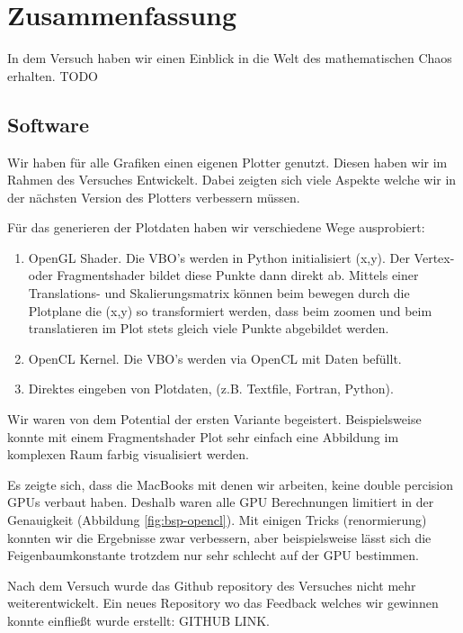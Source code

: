 \documentclass{scrartcl}
\begin{document}
\section { Zusammenfassung }
In dem Versuch haben wir einen Einblick in die Welt des mathematischen Chaos erhalten. TODO
\subsection{Software}
Wir haben für alle Grafiken einen eigenen Plotter genutzt. Diesen haben wir im Rahmen des Versuches Entwickelt. Dabei zeigten sich viele Aspekte welche wir in der nächsten Version des Plotters verbessern müssen.

Für das generieren der Plotdaten haben wir verschiedene Wege ausprobiert:
\begin{enumerate}
\item OpenGL Shader. Die VBO's werden in Python initialisiert (x,y). Der Vertex- oder Fragmentshader bildet diese Punkte dann direkt ab. Mittels einer Translations- und Skalierungsmatrix können beim bewegen durch die Plotplane die (x,y) so transformiert werden, dass beim zoomen und beim translatieren im Plot stets gleich viele Punkte abgebildet werden. 
\item OpenCL Kernel. Die VBO's werden via OpenCL mit Daten befüllt. 
\item Direktes eingeben von Plotdaten, (z.B. Textfile, Fortran, Python).
\end{enumerate}
Wir waren von dem Potential der ersten Variante begeistert. Beispielsweise konnte mit einem Fragmentshader Plot sehr einfach eine Abbildung im komplexen Raum farbig visualisiert werden. 

Es zeigte sich, dass die MacBooks mit denen wir arbeiten, keine double percision GPUs verbaut haben. Deshalb waren alle GPU Berechnungen limitiert in der Genauigkeit (Abbildung \ref{fig:bsp-opencl}). Mit einigen Tricks (renormierung) konnten wir die Ergebnisse zwar verbessern, aber beispielsweise lässt sich die Feigenbaumkonstante trotzdem nur sehr schlecht auf der GPU bestimmen.

Nach dem Versuch wurde das Github repository des Versuches nicht mehr weiterentwickelt. Ein neues Repository wo das Feedback welches wir gewinnen konnte einfließt wurde erstellt: GITHUB LINK. 
\end{document}
